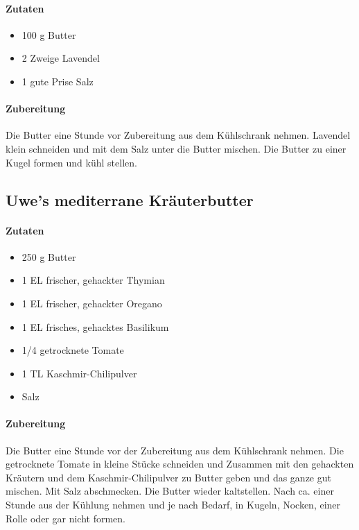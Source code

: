 \paragraph{Zutaten}

\begin{itemize}[noitemsep]
	\item 100 g Butter
	\item 2 Zweige Lavendel
	\item 1 gute Prise Salz
\end{itemize}

\paragraph{Zubereitung}

Die Butter eine Stunde vor Zubereitung aus dem Kühlschrank nehmen. Lavendel 
klein schneiden 
und mit dem Salz unter die Butter mischen. Die Butter zu einer Kugel formen 
und kühl stellen.


\subsection{Uwe's mediterrane Kräuterbutter}\label{Kräuterbutter}

\paragraph{Zutaten}

\begin{itemize}[noitemsep]
	\item 250 g Butter
	\item 1 EL frischer, gehackter Thymian 
	\item 1 EL frischer, gehackter Oregano
	\item 1 EL frisches, gehacktes Basilikum
	\item 1/4 getrocknete Tomate
	\item 1 TL Kaschmir-Chilipulver
	\item Salz
\end{itemize}

\paragraph{Zubereitung}

Die Butter eine Stunde vor der Zubereitung aus dem Kühlschrank nehmen. Die 
getrocknete Tomate in kleine Stücke schneiden und Zusammen mit den 
gehackten Kräutern und dem Kaschmir-Chilipulver zu Butter geben und das 
ganze gut mischen. Mit Salz abschmecken. Die Butter wieder kaltstellen. Nach 
ca. einer Stunde aus der Kühlung nehmen und je nach Bedarf, in Kugeln, 
Nocken, einer Rolle oder gar nicht formen. 
	
